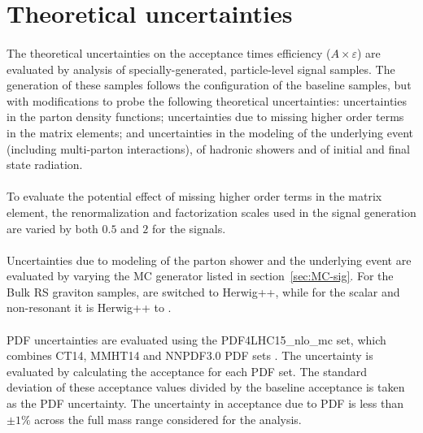 \section{Theoretical uncertainties}
\label{sec:boosted-systematics-theory}
\paragraph{}
The theoretical uncertainties on the acceptance times efficiency ($A\times\varepsilon$) are evaluated by analysis of specially-generated, particle-level signal samples. 
The generation of these samples follows the configuration of the baseline samples, but with modifications to probe the following theoretical uncertainties: uncertainties in the parton density functions; uncertainties due to missing higher order terms in the matrix elements; and uncertainties in the modeling of the underlying event (including multi-parton interactions), of hadronic showers and of initial and final state radiation.

\paragraph{}
To evaluate the potential effect of missing higher order terms in the matrix element, the renormalization and factorization scales used in the signal generation are varied by both $0.5$ and $2$ for the signals.

\paragraph{}
Uncertainties due to modeling of the parton shower and the underlying event are evaluated by varying the MC generator listed in section~\ref{sec:MC-sig}. 
For the Bulk RS graviton samples,  are switched to Herwig++, while for the scalar and non-resonant it is Herwig++ to .

\paragraph{}
PDF uncertainties are evaluated using the PDF4LHC15\_nlo\_mc set, which combines CT14, MMHT14 and NNPDF3.0 PDF sets \cite{0954-3899-43-2-023001}. 
The uncertainty is evaluated by calculating the acceptance for each PDF set. 
The standard deviation of these acceptance values divided by the baseline acceptance is taken as the PDF uncertainty.
The uncertainty in acceptance due to PDF is less than $\pm1\%$ across the full mass range considered for the analysis.

